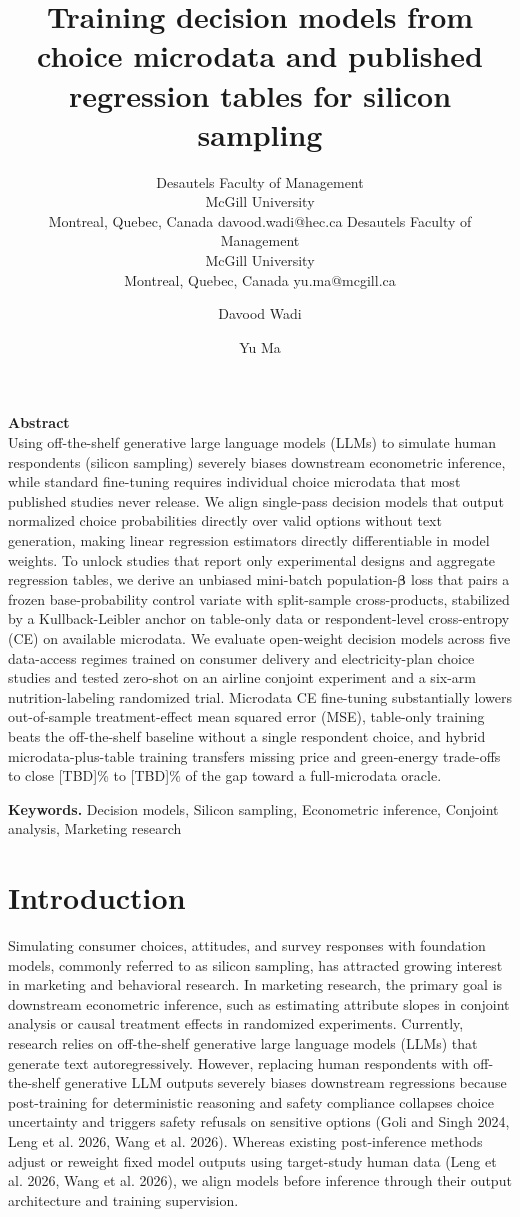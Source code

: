 \documentclass[
  11pt,
  letterpaper,
]{article}
\author{%
    \aclauthor{Davood Wadi}
      {Desautels Faculty of Management\\ McGill University\\ Montreal, Quebec, Canada}
      {davood.wadi@hec.ca}%
    \hspace{3em}%
    \aclauthor{Yu Ma}
      {Desautels Faculty of Management\\ McGill University\\ Montreal, Quebec, Canada}
      {yu.ma@mcgill.ca}%
  }%
\title{Training decision models from choice microdata and published
regression tables for silicon sampling}
\author{Davood Wadi \and Yu Ma}
\date{}
\begin{document}
\maketitle


\textbf{Abstract}\\
Using off-the-shelf generative large language models (LLMs) to simulate
human respondents (silicon sampling) severely biases downstream
econometric inference, while standard fine-tuning requires individual
choice microdata that most published studies never release. We align
single-pass decision models that output normalized choice probabilities
directly over valid options without text generation, making linear
regression estimators directly differentiable in model weights. To
unlock studies that report only experimental designs and aggregate
regression tables, we derive an unbiased mini-batch
population-\(\boldsymbol{\beta}\) loss that pairs a frozen
base-probability control variate with split-sample cross-products,
stabilized by a Kullback-Leibler anchor on table-only data or
respondent-level cross-entropy (CE) on available microdata. We evaluate
open-weight decision models across five data-access regimes trained on
consumer delivery and electricity-plan choice studies and tested
zero-shot on an airline conjoint experiment and a six-arm
nutrition-labeling randomized trial. Microdata CE fine-tuning
substantially lowers out-of-sample treatment-effect mean squared error
(MSE), table-only training beats the off-the-shelf baseline without a
single respondent choice, and hybrid microdata-plus-table training
transfers missing price and green-energy trade-offs to close {[}TBD{]}\%
to {[}TBD{]}\% of the gap toward a full-microdata oracle.

\textbf{Keywords.} Decision models, Silicon sampling, Econometric
inference, Conjoint analysis, Marketing research

\section{Introduction}\label{sec-intro}

Simulating consumer choices, attitudes, and survey responses with
foundation models, commonly referred to as silicon sampling, has
attracted growing interest in marketing and behavioral research. In
marketing research, the primary goal is downstream econometric
inference, such as estimating attribute slopes in conjoint analysis or
causal treatment effects in randomized experiments. Currently, research
relies on off-the-shelf generative large language models (LLMs) that
generate text autoregressively. However, replacing human respondents
with off-the-shelf generative LLM outputs severely biases downstream
regressions because post-training for deterministic reasoning and safety
compliance collapses choice uncertainty and triggers safety refusals on
sensitive options (Goli and Singh 2024, Leng et al. 2026, Wang et al.
2026). Whereas existing post-inference methods adjust or reweight fixed
model outputs using target-study human data (Leng et al. 2026, Wang et
al. 2026), we align models before inference through their output
architecture and training supervision.
\end{document}
